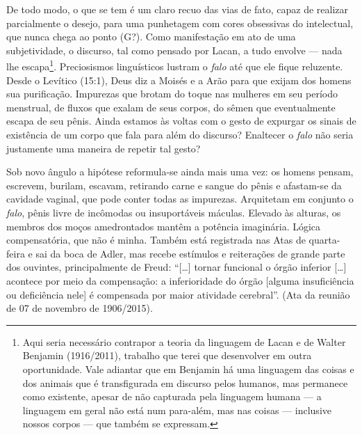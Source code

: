 De todo modo, o que se tem é um claro recuo das vias de fato, capaz de
realizar parcialmente o desejo, para uma punhetagem com cores obsessivas
do intelectual, que nunca chega ao ponto (G?). Como manifestação em ato
de uma subjetividade, o discurso, tal como pensado por Lacan, a tudo
envolve --- nada lhe escapa\footnote{Aqui seria necessário contrapor a
  teoria da linguagem de Lacan e de Walter Benjamin (1916/2011),
  trabalho que terei que desenvolver em outra oportunidade. Vale
  adiantar que em Benjamin há uma linguagem das coisas e dos animais que
  é transfigurada em discurso pelos humanos, mas permanece como
  existente, apesar de não capturada pela linguagem humana --- a
  linguagem em geral não está num para-além, mas nas coisas --- inclusive
  nossos corpos --- que também se expressam.}. Preciosismos linguísticos
lustram o \emph{falo} até que ele fique reluzente. Desde o Levítico
(15:1), Deus diz a Moisés e a Arão para que exijam dos homens sua
purificação. Impurezas que brotam do toque nas mulheres em seu período
menstrual, de fluxos que exalam de seus corpos, do sêmen que
eventualmente escapa de seu pênis. Ainda estamos às voltas com o gesto
de expurgar os sinais de existência de um corpo que fala para além do
discurso? Enaltecer o \emph{falo} não seria justamente uma maneira de
repetir tal gesto?

Sob novo ângulo a hipótese reformula-se ainda mais uma vez: os homens
pensam, escrevem, burilam, escavam, retirando carne e sangue do pênis e
afastam-se da cavidade vaginal, que pode conter todas as impurezas.
Arquitetam em conjunto o \emph{falo}, pênis livre de incômodas ou
insuportáveis máculas. Elevado às alturas, os membros dos moços
amedrontados mantêm a potência imaginária. Lógica compensatória, que não
é minha. Também está registrada nas Atas de quarta-feira e sai da boca
de Adler, mas recebe estímulos e reiterações de grande parte dos
ouvintes, principalmente de Freud: ``{[}\ldots{}{]} tornar funcional o órgão
inferior {[}\ldots{}{]} acontece por meio da compensação: a inferioridade do
órgão {[}alguma insuficiência ou deficiência nele{]} é compensada por
maior atividade cerebral''. (Ata da reunião de 07 de novembro de
1906/2015).

